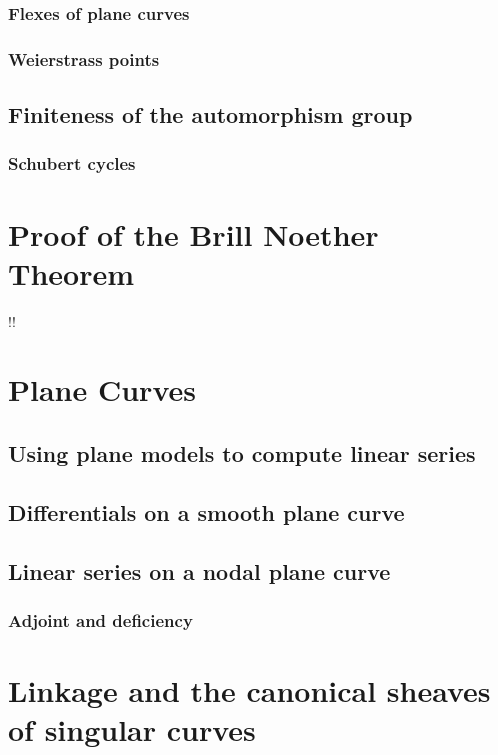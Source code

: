 \begin{theorem}
\subsection{Flexes of plane curves}\label{plane curve pluecker}
\subsection{Weierstrass points}\label{Weierstrass points}
\section{Finiteness of the automorphism group}\label{finiteness section}
\subsection{Schubert cycles}\label{Schubert1}

\chapter{Proof of the Brill Noether Theorem}
\label{Brill Noether proof chapter}!!
\label{BrillNoetherproofChapter}

\chapter{Plane Curves}
\label{PlaneCurvesChapter}
\section{Using plane models to compute linear series} \label{computing linear series}
\section{Differentials on a smooth plane curve}\label{canonical series on smooth plane curves}
\section{Linear series on a nodal plane curve}\label{linear series on nodal plane curves}
\subsection{Adjoint and deficiency}\label{adjoint ideal}

\chapter{Linkage and the canonical sheaves of singular curves}
\label{LiaisonChapter}\label{linkageChapter}\label{LinkageChapter}

\end{theorem}
